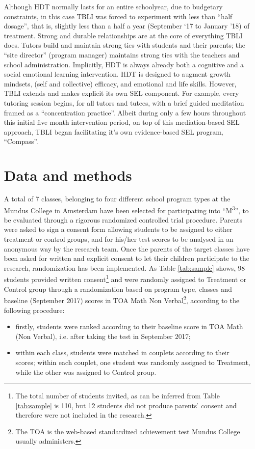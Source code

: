 \documentclass[ 12 pt]{article}
\begin{document}
Although HDT normally lasts for an entire schoolyear, due to budgetary constraints, in this case TBLI was forced to experiment with less than \enquote{half dosage}, that is, slightly less than a half a year (September ‘17 to January ’18) of treatment. 
Strong and durable relationships are at the core of everything TBLI does. Tutors build and maintain strong ties with students and their parents; the \enquote{site director} (program manager) maintains strong ties with the teachers and school administration. Implicitly, HDT is always already both a cognitive and a social emotional learning intervention. HDT is designed to augment growth mindsets, (self and collective) efficacy, and emotional and life skills. However, TBLI extends and makes explicit its own SEL component. For example, every tutoring session begins, for all tutors and tutees, with a brief guided meditation framed as a \enquote{concentration practice}. Albeit during only a few hours throughout this initial five month intervention period, on top of this mediation-based SEL approach, TBLI began facilitating it’s own evidence-based SEL program, \enquote{Compass}.  

\section{Data and methods}
A total of 7 classes, belonging to four different school program types at the Mundus College in Amsterdam have been selected for participating into \enquote{M\textsuperscript{3}}, to be evaluated through a rigorous randomized controlled trial procedure. Parents were asked to sign a consent form allowing students to be assigned to either treatment or control groups, and for his/her test scores to be analysed in an anonymous way by the research team.
Once the parents of the target classes have been asked for written and explicit consent to let their children participate to the research, randomization has been implemented. As Table \ref{tab:sample} shows, 98 students provided written consent\footnote{The total number of students invited, as can be inferred from Table \ref{tab:sample} is 110, but 12 students did not produce parents' consent and therefore were not included in the research.} and were randomly assigned to Treatment or Control group through a randomization based on program type, classes and baseline (September 2017) scores in TOA Math Non Verbal\footnote{The TOA is the web-based standardized achievement test Mundus College usually administers.}, according to the following procedure:
\begin{itemize}
	\item firstly, students were ranked according to their baseline score in TOA Math (Non Verbal), i.e. after taking the test in September 2017;
	\item within each class, students were matched in couplets according to their scores; within each couplet, one student was randomly assigned to Treatment, while the other was assigned to Control group.
\end{itemize}
\end{document}
